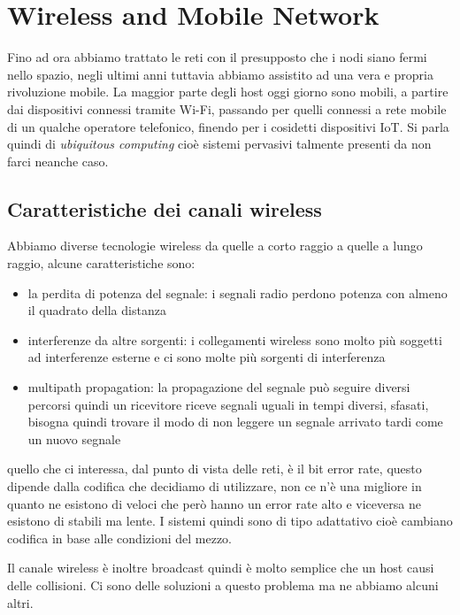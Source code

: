 \section{Wireless and Mobile Network}
Fino ad ora abbiamo trattato le reti con il presupposto che i nodi siano fermi nello spazio, negli ultimi anni tuttavia abbiamo assistito ad una vera e propria rivoluzione mobile.
La maggior parte degli host oggi giorno sono mobili, a partire dai dispositivi connessi tramite Wi-Fi, passando per quelli connessi a rete mobile di un qualche operatore telefonico, finendo per i cosidetti dispositivi IoT.
Si parla quindi di \emph{ubiquitous computing} cioè sistemi pervasivi talmente presenti da non farci neanche caso.

\subsection{Caratteristiche dei canali wireless}
Abbiamo diverse tecnologie wireless da quelle a corto raggio a quelle a lungo raggio, alcune caratteristiche sono:
\begin{itemize}
    \item la perdita di potenza del segnale: i segnali radio perdono potenza con almeno il quadrato della distanza

    \item interferenze da altre sorgenti: i collegamenti wireless sono molto più soggetti ad interferenze esterne e ci sono molte più sorgenti di interferenza
    
    \item multipath propagation: la propagazione del segnale può seguire diversi percorsi quindi un ricevitore riceve segnali uguali in tempi diversi, sfasati, bisogna quindi trovare il modo di non leggere un segnale arrivato tardi come un nuovo segnale
\end{itemize}
quello che ci interessa, dal punto di vista delle reti, è il bit error rate, questo dipende dalla codifica che decidiamo di utilizzare, non ce n'è una migliore in quanto ne esistono di veloci che però hanno un error rate alto e viceversa ne esistono di stabili ma lente.
I sistemi quindi sono di tipo adattativo cioè cambiano codifica in base alle condizioni del mezzo.

Il canale wireless è inoltre broadcast quindi è molto semplice che un host causi delle collisioni. Ci sono delle soluzioni a questo problema ma ne abbiamo alcuni altri.

